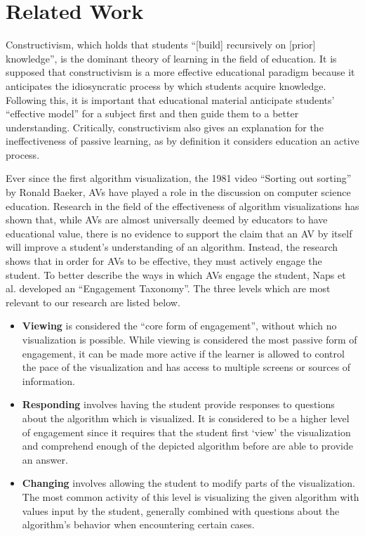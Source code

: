 \documentclass{acm_proc_article-sp}
\begin{document}
\section{Related Work}
Constructivism, which holds that students ``[build] recursively on [prior] knowledge'', is the dominant theory of learning in the field of education.
It is supposed that constructivism is a more effective educational paradigm because it anticipates the idiosyncratic process by which students acquire knowledge\cite{constr}.
Following this, it is important that educational material anticipate students' ``effective model'' for a subject first and then guide them to a better understanding.
Critically, constructivism also gives an explanation for the ineffectiveness of passive learning, as by definition it considers education an active process\cite{constr}.

Ever since the first algorithm visualization, the 1981 video ``Sorting out sorting'' by Ronald Baeker\cite{sorting}, AVs have played a role in the discussion on computer science education.
Research in the field of the effectiveness of algorithm visualizations has shown that, while AVs are almost universally deemed by educators to have educational value\cite{tnaps:visengage}, there is no evidence to support the claim that an AV by itself will improve a student's understanding of an algorithm.
Instead, the research shows that in order for AVs to be effective, they must actively engage the student\cite{tnaps:visengage}.
To better describe the ways in which AVs engage the student, Naps et al.
developed an ``Engagement Taxonomy''.
The three levels which are most relevant to our research are listed below.\cite{tnaps:visengage}

\begin{itemize}

\item \textbf{Viewing} is considered the ``core form of engagement'', without which no visualization is possible.
While viewing is considered the most passive form of engagement, it can be made more active if the learner is allowed to control the pace of the visualization and has access to multiple screens or sources of information.

\item \textbf{Responding} involves having the student provide responses to questions about the algorithm which is visualized.
It is considered to be a higher level of engagement since it requires that the student first `view' the visualization and comprehend enough of the depicted algorithm before are able to provide an answer.

\item \textbf{Changing} involves allowing the student to modify parts of the visualization.
The most common activity of this level is visualizing the given algorithm with values input by the student, generally combined with questions about the algorithm's behavior when encountering certain cases.

\end{itemize}
\end{document}
